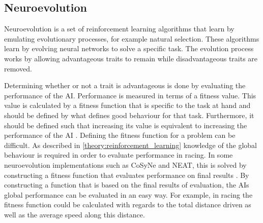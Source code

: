 
\subsection{Neuroevolution}
\label{section:neuroevolution}
Neuroevolution is a set of reinforcement learning algorithms that learn by emulating evolutionary processes, for example natural selection. These algorithms learn by evolving neural networks to solve a specific task. The evolution process works by allowing advantageous traits to remain while disadvantageous traits are removed.  

Determining whether or not a trait is advantageous is done by evaluating the performance of the AI. Performance is measured in terms of a fitness value. This value is calculated by a fitness function that is specific to the task at hand and should be defined by what defines good behaviour for that task. Furthermore, it should be defined such that increasing its value is equivalent to increasing the performance of the AI \cite{nelson}. Defining the fitness function for a problem can be difficult. As described in \ref{theory:reinforcement_learning} knowledge of the global behaviour is required in order to evaluate performance in racing. In some neuroevolution implementations such as CoSyNe and NEAT, this is solved by constructing a fitness function that evaluates performance on final results \cite{gomez:CoSyNE, stanley:neat}. By constructing a function that is based on the final results of evaluation, the AIs global performance can be evaluated in an easy way. For example, in racing the fitness function could be calculated with regards to the total distance driven as well as the average speed along this distance.

